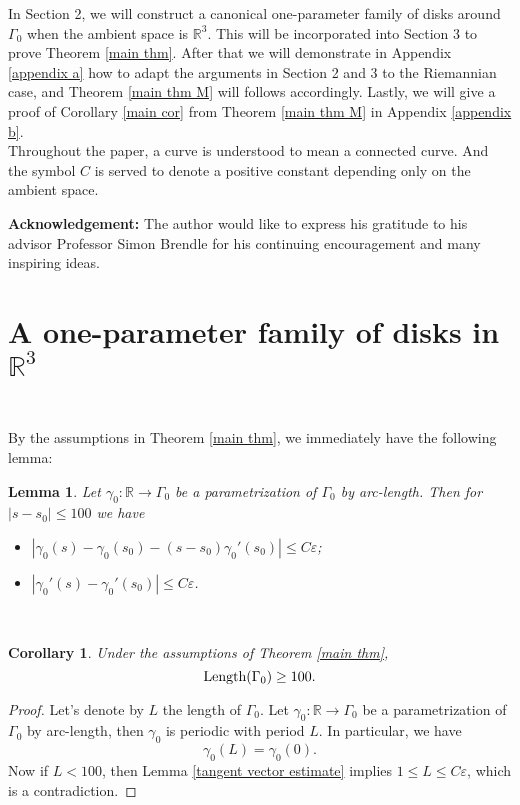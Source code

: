 \documentclass[a4paper, reqno]{amsart}
\newtheorem{lemma}[theorem]{Lemma}
\newtheorem{corollary}[theorem]{Corollary}
\theoremstyle{definition}
\theoremstyle{remark}
\numberwithin{equation}{section}
\newcommand{\Len}{\textup{Length}}
\numberwithin{equation}{section}
\numberwithin{equation}{section}
\begin{document}
In Section 2, we will construct a canonical one-parameter family of disks around $\Gamma_0$ when the ambient space is $\mathbb{R}^3$. This will be incorporated into Section 3 to prove Theorem \ref{main thm}. After that we will demonstrate in Appendix \ref{appendix a} how to adapt the arguments in Section 2 and 3 to the Riemannian case, and Theorem \ref{main thm M} will follows accordingly. Lastly, we will give a proof of Corollary \ref{main cor} from Theorem \ref{main thm M} in Appendix \ref{appendix b}.\\

Throughout the paper, a curve is understood to mean a connected curve. And the symbol $C$ is served to denote a positive constant depending only on the ambient space.

\vskip 0.5cm
\noindent\textbf{Acknowledgement:}
The author would like to express his gratitude to his advisor Professor Simon Brendle for his continuing encouragement and many inspiring ideas.




\bigskip

\section{A one-parameter family of disks in $\mathbb{R}^3$}\

By the assumptions in Theorem \ref{main thm}, we immediately have the following lemma:

\begin{lemma}{\label{tangent vector estimate}}
	Let $\gamma_0:\mathbb{R}\to\Gamma_0$ be a parametrization of $\Gamma_0$ by arc-length. Then for $|s - s_0|\leq 100$ we have
	\begin{itemize}
	\item[(i)] 	$|\gamma_0(s) - \gamma_0(s_0) - (s-s_0)\gamma_0'(s_0)| \leq C\varepsilon$;
	\item[(ii)] $|\gamma_0'(s) - \gamma_0'(s_0)|\leq C\varepsilon$.
	\end{itemize}
\end{lemma}\



\begin{corollary}{\label{Gamma length}}
	Under the assumptions of Theorem \ref{main thm}, 
	\[\Len(\Gamma_0) \geq 100.\]
\end{corollary}

\begin{proof}
	Let's denote by $L$ the length of $\Gamma_0$. Let $\gamma_0:\mathbb{R}\to\Gamma_0$ be a parametrization of $\Gamma_0$ by arc-length, then $\gamma_0$ is periodic with period $L$. In particular, we have
	\[ \gamma_0(L) = \gamma_0(0).\]
	Now if $L < 100$, then Lemma \ref{tangent vector estimate} implies $1\leq L\leq C\varepsilon$, which is a contradiction.
\end{proof}\
\end{document}
